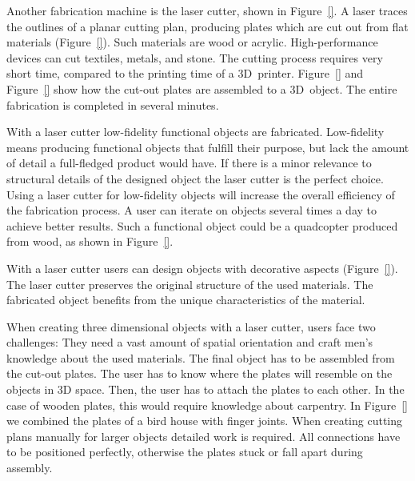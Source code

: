 \documentclass[../ClassicThesis.tex]{subfiles}
\begin{document}
Another fabrication machine is the laser cutter, shown in
Figure~\ref{}. A laser traces the outlines of a
planar cutting plan, producing plates which are cut out from
flat materials (Figure~\ref{}). Such materials
are wood or acrylic. High-performance devices can cut
textiles, metals, and stone. The cutting process requires
very short time, compared to the printing time of a
3D~printer. Figure~\ref{} and Figure~\ref{} show how the
cut-out plates are assembled to a 3D~object. The entire
fabrication is completed in several minutes.

With a laser cutter low-fidelity functional objects are
fabricated. Low-fidelity means producing functional objects
that fulfill their purpose, but lack the amount of detail a
full-fledged product would have. If there is a minor
relevance to structural details of the designed object the
laser cutter is the perfect choice. Using a laser cutter for
low-fidelity objects will increase the overall efficiency of
the fabrication process. A user can iterate on objects
several times a day to achieve better results.
Such a
functional object could be a quadcopter produced from wood, as shown
in Figure~\ref{}.

With a laser cutter users can design objects with decorative
aspects (Figure~\ref{}). The laser cutter
preserves the original structure of the used materials. The
fabricated object benefits from the unique characteristics
of the material.


When creating three dimensional objects with a laser cutter,
users face two challenges: They need a vast amount of
spatial orientation and craft men's knowledge about the used
materials. The final object has to be assembled from the
cut-out plates. The user has to know where the plates will
resemble on the objects in 3D space. Then, the user has to
attach the plates to each other. In the case of wooden
plates, this would require knowledge about carpentry. In
Figure~\ref{} we combined the plates of a bird
house with finger joints. When creating cutting plans
manually for larger objects detailed work is
required. All connections have to be positioned perfectly,
otherwise the plates stuck or fall apart during assembly.
\end{document}
